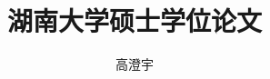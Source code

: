 \documentclass[doctor]{hnuthesis}
\title{湖南大学硕士学位论文} %
\author{高澄宇}
\begin{document}
\maketitle


\tableofcontents
\begingroup
	\renewcommand*{\addvspace}[1]{}
	\newcommand{\loflabel}{图} 
	\renewcommand{\numberline}[1]{\loflabel~#1\hspace*{1em}}	
	\listoffigures
	
	\newcommand{\lotlabel}{表}
	\renewcommand{\numberline}[1]{\lotlabel~#1\hspace*{1em}}
	\listoftables
\endgroup


\mainmatter
%





\appendix



\backmatter

\end{document}

